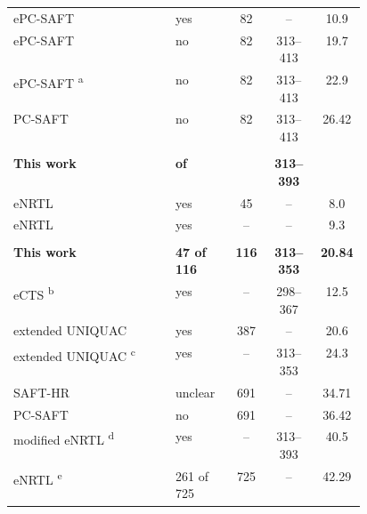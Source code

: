 \begin{table}[pos=!htbp]
\begin{tabular}{@{}>{\raggedright\arraybackslash}p{0.46\linewidth}lccS[table-format=2.2,detect-weight]@{}}
\quad ePC-SAFT \cite{raeispourshiraziApplicationEPC_SAFTMBEoS2020} & yes & 82 & -- & 10.9 \\
\quad ePC-SAFT \cite{Wangler2018} & no & 82 & 313--413 & 19.7 \\
\quad ePC-SAFT \cite{Uyan2015}\textsuperscript{a} & no & 82 & 313--413 & 22.9 \\
\quad PC-SAFT \cite{Pahlavanzadeh2013} & no & 82 & 313--413 & 26.42 \\
\addlinespace{} \\*
\bfseries \quad This work & \bfseries {} of  & \bfseries {} & \bfseries 313--393 & \bfseries {} \\
\quad eNRTL \cite{yiOpenAccessThermodynamically2024} & yes & 45 & -- & 8.0 \\
\quad eNRTL \cite{hartonoSolubilityCO201M2020} & yes & -- & -- & 9.3 \\
\addlinespace{} \\*
\bfseries \quad This work & \bfseries 47 of 116 & \bfseries 116 & \bfseries 313--353 & \bfseries 20.84 \\
\quad eCTS \cite{tellez-arredondoModelingCO2H2S2013}\textsuperscript{b} & yes & -- & 298--367 & 12.5 \\
\quad extended UNIQUAC \cite{bigetDevelopmentThermodynamicIdentification2015a} & yes & 387 & -- & 20.6 \\
\quad extended UNIQUAC \cite{Aronu2011}\textsuperscript{c} & yes & -- & 313--353 & 24.3 \\
\quad SAFT-HR \cite{Najafloo2018} & unclear & 691 & -- & 34.71 \\
\quad PC-SAFT \cite{Baygi2015} & no & 691 & -- & 36.42 \\
\quad modified eNRTL \cite{Akula2023a}\textsuperscript{d} & yes & -- & 313--393 & 40.5 \\
\quad eNRTL \cite{Zhang2011}\textsuperscript{e} & 261 of 725 & 725 & -- & 42.29 \\
\bottomrule\end{tabular}

\end{table}

